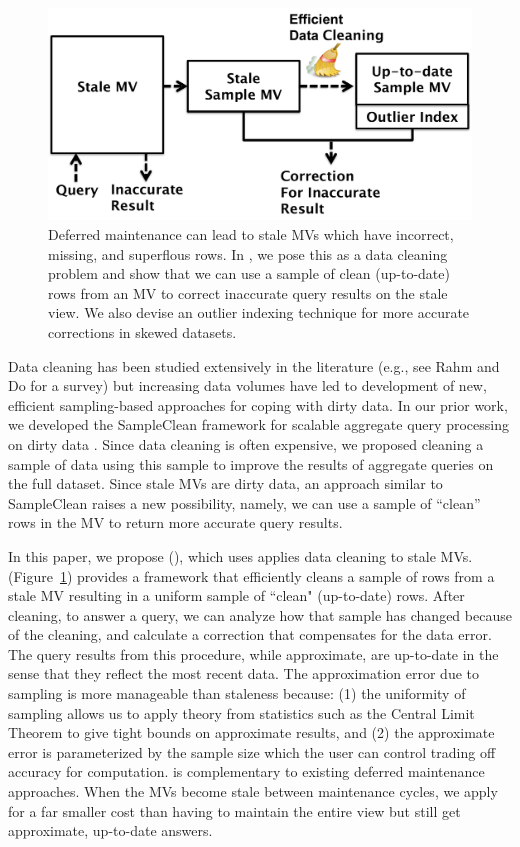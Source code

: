 \begin{figure}[t] \vspace{-2em}
\centering
 \includegraphics[scale=0.25]{figs/sys-arch.pdf} \vspace{-.25em}
 \caption{Deferred maintenance can lead to stale MVs which have incorrect, missing, and superflous rows. In \svc, we pose this as a data cleaning problem and show that we can use a sample of clean (up-to-date) rows from an MV to correct inaccurate query results on the stale view. We also devise an outlier indexing technique for more accurate corrections in skewed datasets. \label{sys-arch}}\vspace{-1.75em}
\end{figure}

Data cleaning has been studied extensively in the literature (e.g., see Rahm and Do for a survey\cite{rahm2000data}) but increasing data volumes have led to development of new, efficient sampling-based approaches for coping with dirty data.   
In our prior work, we developed the SampleClean framework for scalable aggregate query processing on dirty data \cite{wang1999sample}.
Since data cleaning is often expensive, we proposed cleaning a sample of data using this sample to improve the results of aggregate queries on the full dataset.
Since stale MVs are dirty data, an approach similar to SampleClean raises a new possibility, namely, we can use a sample of ``clean'' rows in the MV to return more accurate query results.

In this paper, we propose \svcfull (\svc), which uses applies data cleaning to stale MVs.
\svc (Figure~\ref{sys-arch}) provides a framework that efficiently cleans a sample of rows from a stale MV resulting in a uniform sample of ``clean" (up-to-date) rows.
After cleaning, to answer a query, we can analyze how that sample has changed because of the cleaning, and calculate a correction that compensates for the data error. 
The query results from this procedure, while approximate, are up-to-date in the sense that they reflect the most recent data. 
The approximation error due to sampling is more manageable than staleness because: (1) the uniformity of sampling allows us to apply theory from statistics such as the Central Limit Theorem to give tight bounds on approximate results, and (2) the approximate error is parameterized by the sample size which the user can control trading off accuracy for computation.
\svc is complementary to existing deferred maintenance approaches.
When the MVs become stale between maintenance cycles, we apply \svc for a far smaller cost than having to maintain the entire view but still get approximate, up-to-date answers.


